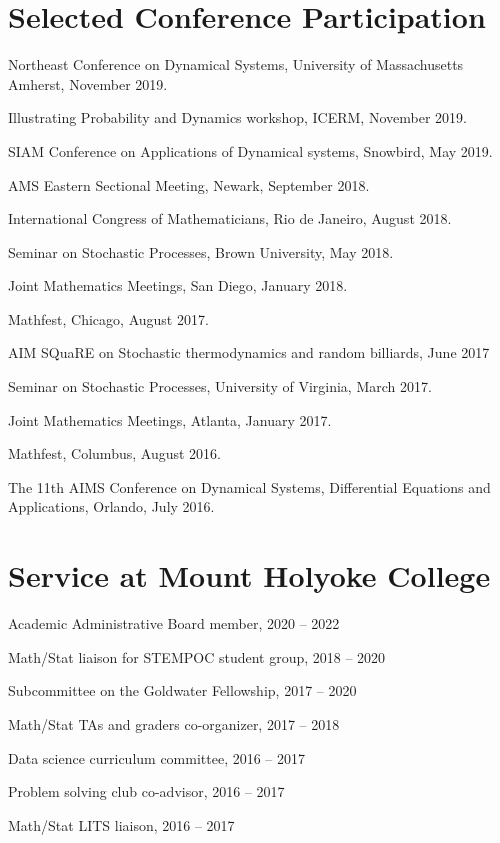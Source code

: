 \documentclass[10pt,letterpaper]{article}
\renewenvironment{itemize}{
  \begin{list}{}{
    \setlength{\leftmargin}{1.5em}
    \setlength{\itemsep}{0.25em}
    \setlength{\parskip}{0pt}
    \setlength{\parsep}{0.25em}
  }
}{
  \end{list}
}
\providecommand{\tightlist}{%
  \setlength{\itemsep}{0pt}\setlength{\parskip}{0pt}}
\let\tightlist\relax
\begin{document}
\hypertarget{selected-conference-participation}{%
\section*{Selected Conference
Participation}\label{selected-conference-participation}}

\begin{itemize}
\item
  Northeast Conference on Dynamical Systems, University of Massachusetts
  Amherst, November 2019.
\item
  Illustrating Probability and Dynamics workshop, ICERM, November 2019.
\item
  SIAM Conference on Applications of Dynamical systems, Snowbird, May
  2019.
\item
  AMS Eastern Sectional Meeting, Newark, September 2018.
\item
  International Congress of Mathematicians, Rio de Janeiro, August 2018.
\item
  Seminar on Stochastic Processes, Brown University, May 2018.
\item
  Joint Mathematics Meetings, San Diego, January 2018.
\item
  Mathfest, Chicago, August 2017.
\item
  AIM SQuaRE on Stochastic thermodynamics and random billiards, June
  2017
\item
  Seminar on Stochastic Processes, University of Virginia, March 2017.
\item
  Joint Mathematics Meetings, Atlanta, January 2017.
\item
  Mathfest, Columbus, August 2016.
\item
  The 11th AIMS Conference on Dynamical Systems, Differential Equations
  and Applications, Orlando, July 2016.
\end{itemize}

\hypertarget{service-at-mount-holyoke-college}{%
\section*{Service at Mount Holyoke
College}\label{service-at-mount-holyoke-college}}

\begin{itemize}
\tightlist
\item
  Academic Administrative Board member, 2020 -- 2022
\item
  Math/Stat liaison for STEMPOC student group, 2018 -- 2020
\item
  Subcommittee on the Goldwater Fellowship, 2017 -- 2020
\item
  Math/Stat TAs and graders co-organizer, 2017 -- 2018
\item
  Data science curriculum committee, 2016 -- 2017
\item
  Problem solving club co-advisor, 2016 -- 2017
\item
  Math/Stat LITS liaison, 2016 -- 2017
\end{itemize}
\end{document}
